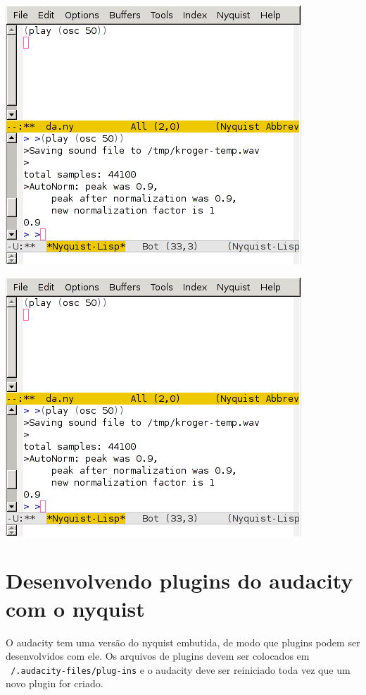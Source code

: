 \documentclass[12pt,brazil]{book}
\begin{document}
\begin{htmlonly}
  \includegraphics{ny2}
\end{htmlonly}

\begin{latexonly}
  \includegraphics[scale=.5]{ny2}
\end{latexonly}

\section{Desenvolvendo plugins do audacity com o nyquist}
\label{sec:desenv-plug-do}

O audacity tem uma versão do nyquist embutida, de modo que plugins
podem ser desenvolvidos com ele. Os arquivos de plugins devem ser
colocados em \texttt{~/.audacity-files/plug-ins} e o audacity deve ser
reiniciado toda vez que um novo plugin for criado. 
\end{document}
